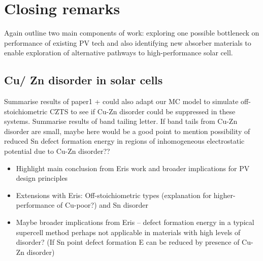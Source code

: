 \documentclass[11pt, twoside]{report}
\begin{document}






\chapter{Closing remarks}
Again outline two main components of work: exploring one possible bottleneck on performance of existing PV tech and also identifying new absorber materials to enable exploration of alternative pathways to high-performance solar cell.

\section{Cu/ Zn disorder in {\CZTS} solar cells}
Summarise results of paper1 + could also adapt our MC model to simulate off-stoichiometric CZTS to see if Cu-Zn disorder could be suppressed in these systems. Summarise results of band tailing letter. If band tails from Cu-Zn disorder are small, maybe here would be a good point to mention possibility of reduced Sn defect formation energy in regions of inhomogeneous electrostatic potential due to Cu-Zn disorder??
\begin{itemize}
\item Highlight main conclusion from Eris work and broader implications for PV design principles
\item Extensions with Eris: Off-stoichiometric types (explanation for higher-performance of Cu-poor?) and Sn disorder
\item Maybe broader implications from Eris – defect formation energy in a typical supercell method perhaps not applicable in materials with high levels of disorder? (If Sn point defect formation E can be reduced by presence of Cu-Zn disorder)
\end{itemize}
\end{document}
